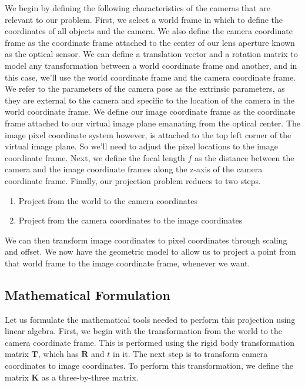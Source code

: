 We begin by defining the following
characteristics of the cameras that are
relevant to our problem. First, we select
a world frame in which to define the coordinates of
all objects and the camera. We also define the camera coordinate frame as
the coordinate frame attached to the center of our lens aperture known
as the optical sensor. We can define a translation
vector and a rotation matrix to model any transformation between a world coordinate
frame and another, and in this case, we'll use the world coordinate frame and
the camera coordinate frame. We refer to the parameters
of the camera pose as the extrinsic parameters, as they are external to
the camera and specific to the location of the camera in the world coordinate frame. We define our image coordinate frame as the coordinate
frame attached to our virtual image plane emanating from
the optical center. The image pixel coordinate system however, is attached to
the top left corner of the virtual image plane. So we'll need to adjust the pixel locations to
the image coordinate frame. Next, we define the focal length $f$
as the distance between the camera and the
image coordinate frames along the z-axis of
the camera coordinate frame. Finally, our projection
problem reduces to two steps. 

\begin{enumerate}
\item Project from the world to the camera coordinates
\item Project from the camera coordinates to the image coordinates 
\end{enumerate}

We can then transform
image coordinates to pixel coordinates through
scaling and offset. We now have the geometric model to allow us to
project a point from that world frame to the image coordinate frame,
whenever we want. 


\subsection{Mathematical Formulation}

Let us formulate the mathematical tools needed to perform this
projection using linear algebra. First, we begin with
the transformation from the world to the camera
coordinate frame. This is performed using the rigid body
transformation matrix $\mathbf{T}$, which has $\mathbf{R}$ and $t$ in it. The next step is to transform camera coordinates to
image coordinates. To perform this transformation, we define the matrix $\mathbf{K}$ as
a three-by-three matrix. 

